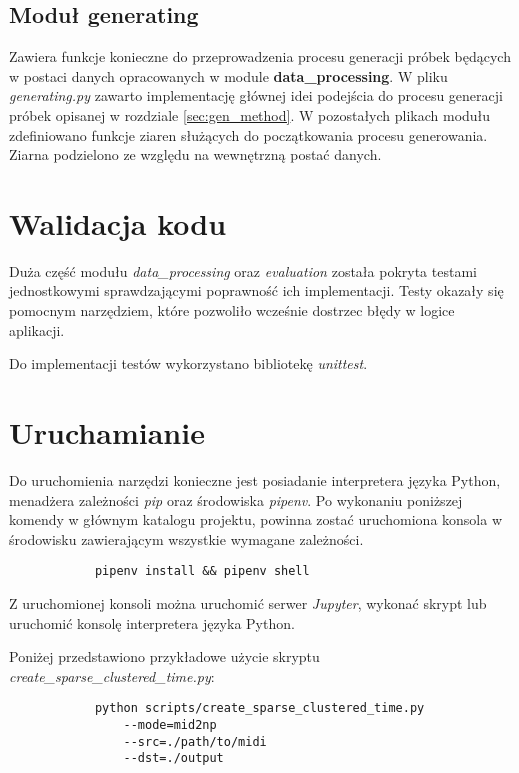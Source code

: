 {{        \subsection{Moduł generating}
        {
            Zawiera funkcje konieczne do przeprowadzenia procesu generacji próbek będących w postaci danych opracowanych w module {\textbf {data\_processing}}. W pliku {\textit {generating.py}} zawarto implementację głównej idei podejścia do procesu generacji próbek opisanej w rozdziale \ref{sec:gen_method}. W pozostałych plikach modułu zdefiniowano funkcje ziaren służących do początkowania procesu generowania. Ziarna podzielono ze względu na wewnętrzną postać danych.
        }

    }

    \section{Walidacja kodu}
    {
        Duża część modułu {\textit {data\_processing}} oraz {\textit {evaluation}} została pokryta testami jednostkowymi sprawdzającymi poprawność ich implementacji. 
        Testy okazały się pomocnym narzędziem, które pozwoliło wcześnie dostrzec błędy w logice aplikacji.

        Do implementacji testów wykorzystano bibliotekę {\textit {unittest}}.
    }

    \pagebreak

    \section{Uruchamianie}
    {
        Do uruchomienia narzędzi konieczne jest posiadanie interpretera języka Python, menadżera zależności {\textit {pip}} oraz środowiska {\textit {pipenv}}. Po wykonaniu poniższej komendy w głównym katalogu projektu, powinna zostać uruchomiona konsola w środowisku zawierającym wszystkie wymagane zależności.

        \begin{verbatim}
            pipenv install && pipenv shell
        \end{verbatim}

        Z uruchomionej konsoli można uruchomić serwer {\textit {Jupyter}}, wykonać skrypt lub uruchomić konsolę interpretera języka Python.


        Poniżej przedstawiono przykładowe użycie skryptu \\{\textit {create\_sparse\_clustered\_time.py}}:
        \begin{verbatim}
            python scripts/create_sparse_clustered_time.py 
                --mode=mid2np 
                --src=./path/to/midi 
                --dst=./output
        \end{verbatim}
    }
}